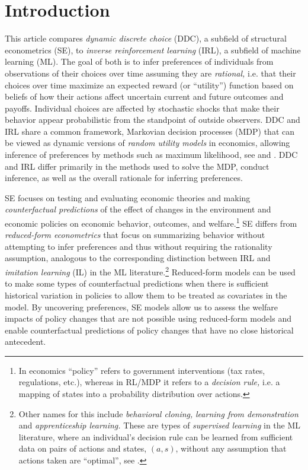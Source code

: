 

\section{Introduction\label{sec:introduction}}

This article compares {\it dynamic discrete choice\/} (DDC), a subfield of structural econometrics (SE),
to {\it inverse reinforcement learning\/} (IRL), a subfield of machine learning (ML). 
The goal of both is to infer preferences of individuals from observations of their choices over time 
assuming they are {\it rational,\/} i.e. that their choices over time maximize an expected reward (or ``utility'') function based on 
beliefs of how their actions affect uncertain current and future outcomes and payoffs. 
Individual  choices are affected by stochastic shocks that make their behavior appear probabilistic
from the standpoint of outside observers. DDC and IRL share a common framework, Markovian decision processes (MDP)
that can be viewed as dynamic versions of {\it random utility models\/} in economics, allowing
inference of preferences by methods such as
maximum likelihood, see \citet{mcfadden:1973} and \citet{rust:1987}. DDC and IRL differ primarily in the methods used to
solve the MDP, conduct inference, as well as the overall rationale for inferring preferences.

SE focuses on  testing and evaluating economic theories and making {\it counterfactual predictions\/}
of the effect of changes in the environment and
economic policies on economic behavior, outcomes, and welfare.\footnote{\footnotesize In economics ``policy'' refers to government interventions (tax rates, regulations, etc.), whereas
in RL/MDP it refers to a {\it decision rule,\/} i.e. a mapping of states into a probability distribution over actions.} 
SE differs from {\it reduced-form econometrics\/} that focus on summarizing behavior without attempting to infer 
preferences and thus without requiring the rationality assumption, analogous to the corresponding distinction
 between IRL and {\it imitation learning\/} (IL) in the ML literature.\footnote{\footnotesize
Other names for this include {\it behavioral cloning,\/} {\it learning from demonstration\/} and {\it apprenticeship learning.\/}
These are types of {\it supervised learning\/} in the ML literature, where an 
individual's decision rule can be learned from sufficient data on pairs of actions and states, $(a,s)$, without
any assumption that actions taken are ``optimal'',  see \citet{hussein:2018}.}
Reduced-form models can be used to make
some types of counterfactual predictions when there is sufficient
historical variation in policies to allow them to be treated as covariates in the model.
By uncovering preferences, SE models allow us to assess the welfare impacts of policy changes that are not
possible using reduced-form models and enable 
counterfactual predictions of policy changes that have no close historical antecedent.

